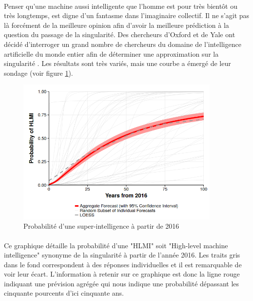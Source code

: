 \documentclass[10pt, french, a4paper]{article}
\begin{document}
\paragraph{}
Penser qu’une machine aussi intelligente que l’homme est pour très bientôt ou très longtemps, est digne d’un fantasme dans l’imaginaire collectif. Il ne s’agit pas là forcément de la meilleure opinion afin d’avoir la meilleure prédiction à la question du passage de la singularité. Des chercheurs d’Oxford et de Yale ont décidé d’interroger un grand nombre de chercheurs du domaine de l’intelligence artificielle du monde entier afin de déterminer une approximation sur la singularité \citep{grace_when_2017}. Les résultats sont très variés, mais une courbe a émergé de leur sondage (voir figure \ref{fig:proba_super_ia}).

\begin{figure}[hbt!]
    \centering
    \includegraphics[width=0.9\textwidth]{images/grace_2017_proba_super_ia.png}
    \caption{Probabilité d'une super-intelligence à partir de 2016 \citep{grace_when_2017}}
    \label{fig:proba_super_ia}
\end{figure}

\paragraph{}
Ce graphique détaille la probabilité d’une "HLMI" soit "High-level machine intelligence" synonyme de la singularité à partir de l’année 2016. Les traits gris dans le fond correspondent à des réponses individuelles et il est remarquable de voir leur écart. L’information à retenir sur ce graphique est donc la ligne rouge indiquant une prévision agrégée qui nous indique une probabilité dépassant les cinquante pourcents d’ici cinquante ans.
\end{document}
